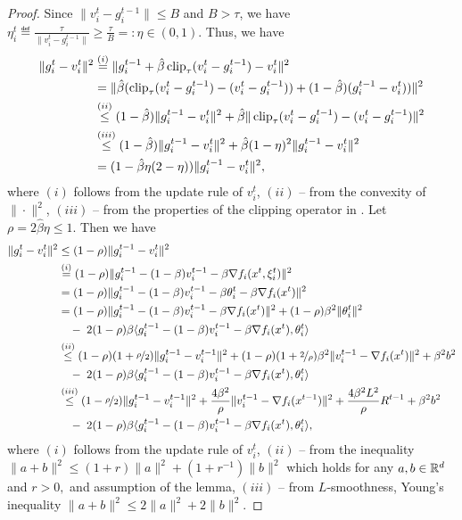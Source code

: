 \documentclass[a4paper,11pt]{article}
\begin{document}
\begin{proof}
    Since $\|v_i^t-g_i^{t-1}\|\le B$ and $B > \tau$, we have $\eta^t_i \eqdef \frac{\tau}{\|v_i^t-g_i^{t-1}\|} \ge \frac{\tau}{B} =: \eta \in (0,1)$. Thus, we have 
    \begin{align*}
         \|g_i^{t} - v_i^{t}\|^2 &\overset{(i)}{=} \|g_i^{t-1} + \hat{\beta}\operatorname{clip}_{\tau}(v_i^t - g_i^{t-1}) - v_i^t\|^2\\
         &= \|\hat{\beta}(\operatorname{clip}_{\tau}(v_i^t - g_i^{t-1}) - (v_i^t - g_i^{t-1})) + (1-\hat{\beta})(g_i^{t-1} - v_i^t ))\|^2\\
         &\overset{(ii)}{\le} (1-\hat{\beta})\|g_i^{t-1} - v_i^t\|^2
         + \hat{\beta}\|\operatorname{clip}_{\tau}(v_i^t - g_i^{t-1}) - (v_i^t - g_i^{t-1})\|^2\\
         &\overset{(iii)}{\le} 
         (1-\hat{\beta})\|g_i^{t-1} - v_i^t\|^2
         + \hat{\beta}(1-\eta)^2\|g_i^{t-1} - v_i^t\|^2\\
         &= (1-\hat{\beta}\eta(2-\eta))\|g_i^{t-1} - v_i^t\|^2,
    \end{align*}
    where $(i)$ follows from the update rule of $v_i^t$, $(ii)$ -- from the convexity of $\|\cdot\|^2$, $(iii)$ -- from the properties of the clipping operator in . Let $\rho = 2\hat{\beta}\eta \le 1.$ Then we have 
    \begin{align*}
        \|g_i^t - v_i^t\|^2 &\le (1-\rho)\|g_i^{t-1} - v_i^t\|^2\\
        &\overset{(i)}{=} (1-\rho)\|g_i^{t-1} - (1-\beta)v_i^{t-1} - \beta\nabla f_i(x^t,\xi^t_i)\|^2\\
        &= (1-\rho)\|g_i^{t-1} - (1-\beta)v_i^{t-1} - \beta\theta^t_i - \beta\nabla f_i(x^t)\|^2\\
        &= (1-\rho)\|g_i^{t-1} - (1-\beta)v_i^{t-1} - \beta\nabla f_i(x^t)\|^2
        + (1-\rho)\beta^2\|\theta^t_i\|^2\\
        &\quad -\; 2(1-\rho)\beta\<g_i^{t-1} - (1-\beta)v_i^{t-1} - \beta\nabla f_i(x^t), \theta^t_i>\\
        &\overset{(ii)}{\le} (1-\rho)(1+\nicefrac{\rho}{2})\|g_i^{t-1} - v_i^{t-1}\|^2
        + (1-\rho)(1+\nicefrac{2}{\rho})\beta^2\|v_i^{t-1} - \nabla f_i(x^t)\|^2
        + \beta^2b^2\\
        &\quad -\; 2(1-\rho)\beta\<g_i^{t-1} - (1-\beta)v_i^{t-1} - \beta\nabla f_i(x^t), \theta^t_i>\\
        &\overset{(iii)}{\le} (1-\nicefrac{\rho}{2})\|g_i^{t-1} - v_i^{t-1}\|^2
        + \frac{4\beta^2}{\rho}\|v_i^{t-1} - \nabla f_i(x^{t-1})\|^2 
        + \frac{4\beta^2L^2}{\rho}R^{t-1} 
        + \beta^2b^2\\
        &\quad -\; 2(1-\rho)\beta\<g_i^{t-1} - (1-\beta)v_i^{t-1} - \beta\nabla f_i(x^t), \theta^t_i>,
    \end{align*}
    where $(i)$ follows from the update rule of $v_i^t$, $(ii)$ -- from the inequality $\|a+b\|^2 \le (1+r)\|a\|^2 + (1+r^{-1})\|b\|^2$ which holds for any $a,b\in\mathbb{R}^d$ and $r>0,$ and assumption of the lemma, $(iii)$ -- from $L$-smoothness, Young's inequality $\|a+b\|^2 \le 2\|a\|^2 + 2\|b\|^2$.
\end{proof}
\end{document}

